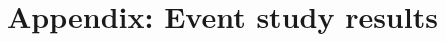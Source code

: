 \documentclass[../main.tex]{subfiles}
\begin{document}
\section{Appendix: Event study results}
\label{sec:appendixc}
\end{document}
